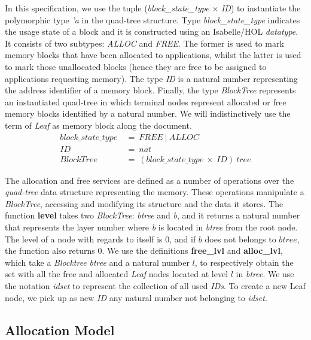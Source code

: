 In this specification, we use the tuple (\emph{block\_state\_type} $\times$ \emph{ID}) to instantiate the polymorphic type \emph{'a} in the quad-tree structure. Type \emph{block\_state\_type} indicates the usage state of a block and it is constructed using an Isabelle/HOL \emph{datatype}. It consists of two subtypes: \emph{ALLOC} and \emph{FREE}. The former is used to mark memory blocks that have been allocated to applications, whilst the latter is used to mark those unallocated blocks (hence they are free to be assigned to applications requesting memory). The type \emph{ID} is a natural number representing the address identifier of a memory block. Finally, the type \emph{BlockTree} represents an instantiated quad-tree in which terminal nodes represent allocated or free memory blocks identified by a natural number. We will indistinctively use the term of \emph{Leaf} as memory block along the document.
\begin{align*}
block\_state\_type\ &=\ FREE\ |\ ALLOC \\
ID\ &=\ nat \\
BlockTree\ &=\ (block\_state\_type\ \times\ ID)\ tree
\end{align*}

The allocation and free services are defined as a number of operations over the \emph{quad-tree} data structure representing the memory. These operations manipulate a \textsl{BlockTree}, accessing and modifying its structure and the data it stores. The function \textbf{level} takes two \emph{BlockTree}: \emph{btree} and \emph{b}, and it returns a natural number that represents the layer number where \emph{b} is located in \emph{btree} from the root node. The level of a node with regards to itself is $0$, and if $b$ does not belongs to $btree$, the function also returns $0$. We use the definitions \textbf{free\_lvl} and \textbf{alloc\_lvl}, which take a \emph{Blocktree} \emph{btree} and a natural number $l$, to respectively obtain the set with all the free and allocated \emph{Leaf} nodes located at level $l$ in \emph{btree}. We use the notation \emph{idset} to represent the collection of all used \emph{IDs}. To create a new Leaf node, we pick up as new \emph{ID} any natural number not belonging to \emph{idset}.

\subsection{Allocation Model}

